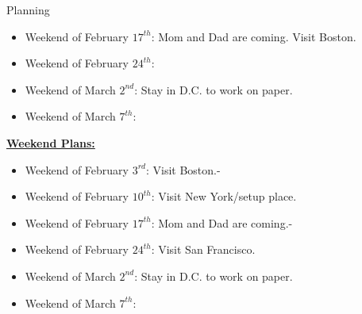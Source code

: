 \documentclass[serif, mathserif, final]{beamer}
\newcommand{\te}[1]{\textit{TimeEst:}\textit{#1}}
\newcommand{\dl}[1]{\textit{Deadline:}\textit{#1}}
\begin{document}
\begin{frame}
\begin{columns}
\begin{column}{0.5\textwidth}
\begin{block}{Planning}
\begin{itemize}
\item \tiny Weekend of February $17^{th}$: Mom and Dad are coming. Visit Boston. 
\item \tiny Weekend of February $24^{th}$:  
\item \tiny Weekend of March $2^{nd}$: Stay in D.C. to work on paper. 
\item \tiny Weekend of March $7^{th}$: 
\end{itemize}

{\underline{\bf Weekend Plans:}} 
\begin{itemize}
\item \tiny Weekend of February $3^{rd}$: Visit Boston.- 
\item \tiny Weekend of February $10^{th}$: Visit New York/setup place. 
\item \tiny Weekend of February $17^{th}$: Mom and Dad are coming.-
\item \tiny Weekend of February $24^{th}$: Visit San Francisco.
\item \tiny Weekend of March $2^{nd}$: Stay in D.C. to work on paper. 
\item \tiny Weekend of March $7^{th}$:
\end{itemize}
\end{block}
\end{column} %
\end{columns} 
\end{frame} 
\end{document}
